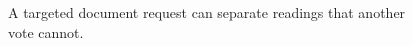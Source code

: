 \begin{figure}[H]
\centering
{}
\caption{A targeted document request can separate readings that another vote cannot.}\label{fig:teach-M05-08}
\end{figure}
